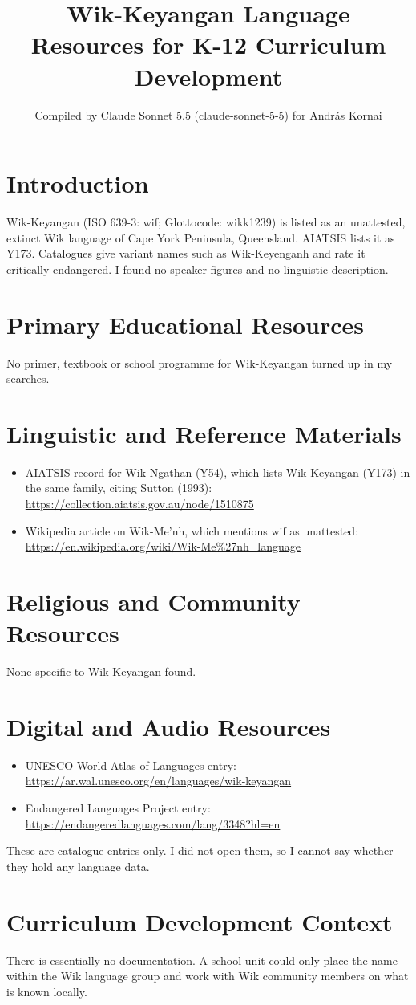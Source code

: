 \documentclass[12pt]{article}
\title{Wik-Keyangan Language Resources for K-12 Curriculum Development}
\author{Compiled by Claude Sonnet 5.5 (claude-sonnet-5-5) for Andr\'as Kornai}
\date{}
\begin{document}
\maketitle

\section{Introduction}
Wik-Keyangan (ISO 639-3: wif; Glottocode: wikk1239) is listed as an unattested, extinct Wik language of Cape York Peninsula, Queensland. AIATSIS lists it as Y173. Catalogues give variant names such as Wik-Keyenganh and rate it critically endangered. I found no speaker figures and no linguistic description.

\section{Primary Educational Resources}
No primer, textbook or school programme for Wik-Keyangan turned up in my searches.

\section{Linguistic and Reference Materials}
\begin{itemize}
\item AIATSIS record for Wik Ngathan (Y54), which lists Wik-Keyangan (Y173) in the same family, citing Sutton (1993): \url{https://collection.aiatsis.gov.au/node/1510875}
\item Wikipedia article on Wik-Me'nh, which mentions wif as unattested: \url{https://en.wikipedia.org/wiki/Wik-Me%27nh_language}
\end{itemize}

\section{Religious and Community Resources}
None specific to Wik-Keyangan found.

\section{Digital and Audio Resources}
\begin{itemize}
\item UNESCO World Atlas of Languages entry: \url{https://ar.wal.unesco.org/en/languages/wik-keyangan}
\item Endangered Languages Project entry: \url{https://endangeredlanguages.com/lang/3348?hl=en}
\end{itemize}
These are catalogue entries only. I did not open them, so I cannot say whether they hold any language data.

\section{Curriculum Development Context}
There is essentially no documentation. A school unit could only place the name within the Wik language group and work with Wik community members on what is known locally.
\end{document}
